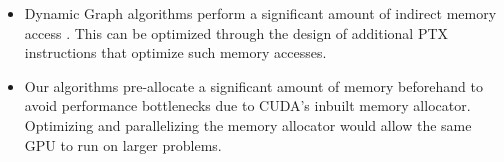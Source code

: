 \begin{itemize}[noitemsep, leftmargin=*]
  \item Dynamic Graph algorithms perform a significant amount of indirect memory access \cite{memory-yu15}. This can be optimized through the design of additional PTX instructions that optimize such memory accesses.
  \item Our algorithms pre-allocate a significant amount of memory beforehand to avoid performance bottlenecks due to CUDA's inbuilt memory allocator. Optimizing and parallelizing the memory allocator would allow the same GPU to run on larger problems.
\end{itemize}
